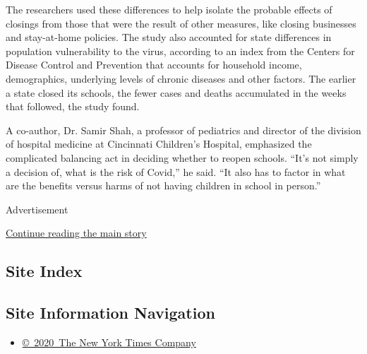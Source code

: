 The researchers used these differences to help isolate the probable
effects of closings from those that were the result of other measures,
like closing businesses and stay-at-home policies. The study also
accounted for state differences in population vulnerability to the
virus, according to an index from the Centers for Disease Control and
Prevention that accounts for household income, demographics, underlying
levels of chronic diseases and other factors. The earlier a state closed
its schools, the fewer cases and deaths accumulated in the weeks that
followed, the study found.

A co-author, Dr. Samir Shah, a professor of pediatrics and director of
the division of hospital medicine at Cincinnati Children's Hospital,
emphasized the complicated balancing act in deciding whether to reopen
schools. ``It's not simply a decision of, what is the risk of Covid,''
he said. ``It also has to factor in what are the benefits versus harms
of not having children in school in person.''

Advertisement

\protect\hyperlink{after-bottom}{Continue reading the main story}

\hypertarget{site-index}{%
\subsection{Site Index}\label{site-index}}

\hypertarget{site-information-navigation}{%
\subsection{Site Information
Navigation}\label{site-information-navigation}}

\begin{itemize}
\tightlist
\item
  \href{https://help.nytimes3xbfgragh.onion/hc/en-us/articles/115014792127-Copyright-notice}{©~2020~The
  New York Times Company}
\end{itemize}

